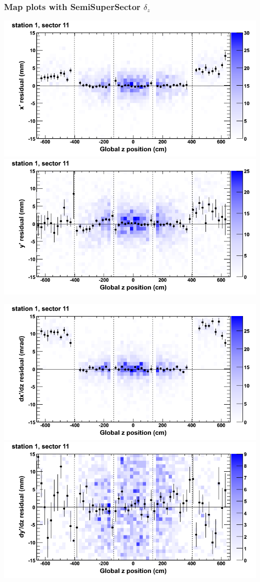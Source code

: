 \documentclass[compress]{beamer}
\begin{document}
\begin{frame}
\frametitle{Map plots with SemiSuperSector $\delta_z$}
\includegraphics[width=0.5\linewidth]{zfit_mapplots/DTvsz_st1sec11_x.png}
\includegraphics[width=0.5\linewidth]{zfit_mapplots/DTvsz_st1sec11_y.png}

\includegraphics[width=0.5\linewidth]{zfit_mapplots/DTvsz_st1sec11_dxdz.png}
\includegraphics[width=0.5\linewidth]{zfit_mapplots/DTvsz_st1sec11_dydz.png}
\end{frame}
\end{document}
